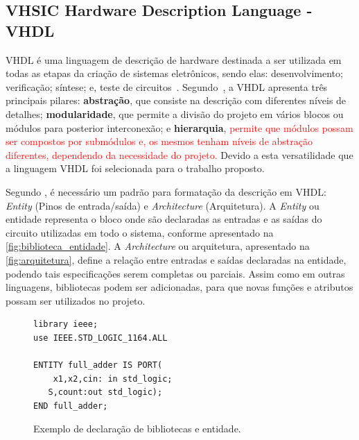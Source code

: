 
\subsection{\label{sec:vhdl_seção}VHSIC Hardware Description Language - VHDL}
VHDL é uma linguagem de descrição de hardware destinada a ser utilizada em todas as etapas da criação de sistemas eletrônicos, sendo elas: desenvolvimento; verificação; síntese; e, teste de circuitos~\cite{IEEEVHDLLanguage}.
% 
Segundo~, a VHDL apresenta três principais pilares: \textbf{abstração}, que consiste na descrição com diferentes níveis de detalhes; \textbf{modularidade}, que permite a divisão do projeto em vários blocos ou módulos para posterior interconexão; e \textbf{hierarquia}, \textcolor{red}{permite que módulos possam ser compostos por submódulos e, os mesmos tenham níveis de abstração diferentes, dependendo da necessidade do projeto.} Devido a esta versatilidade que a linguagem VHDL foi selecionada para o trabalho proposto.

\par
Segundo , é necessário um padrão para formatação da descrição em VHDL: \textit{Entity} (Pinos de entrada/saída) e \textit{Architecture} (Arquitetura). A \textit{Entity} ou entidade representa o bloco onde são declaradas as entradas e as saídas do circuito utilizadas em todo o sistema, conforme apresentado na \autoref{fig:biblioteca_entidade}. A \textit{Architecture} ou arquitetura, apresentado na \autoref{fig:arquitetura}, define a relação entre entradas e saídas declaradas na entidade, podendo tais especificações serem completas ou parciais. Assim como em outras linguagens, bibliotecas podem ser adicionadas, para que novas funções e atributos possam ser utilizados no projeto.

\begin{figure}[H]
\caption{\label{fig:biblioteca_entidade} Exemplo de declaração de bibliotecas e entidade.}
	\begin{center}
    \begin{minipage}{0.6\textwidth}
    \begin{lstlisting}       
library ieee;
use IEEE.STD_LOGIC_1164.ALL

ENTITY full_adder IS PORT(
	x1,x2,cin: in std_logic;
   S,count:out std_logic);
END full_adder;
\end{lstlisting}
    \end{minipage}
	\end{center}
\end{figure}

